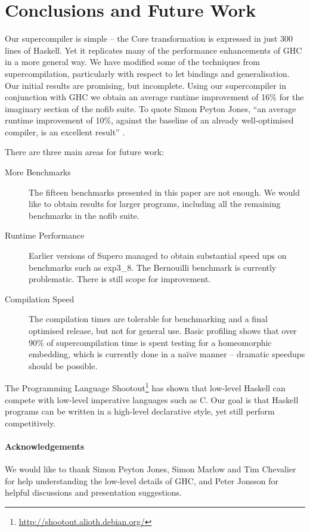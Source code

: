 \section{Conclusions and Future Work}
\label{sec:conclusion}

Our supercompiler is simple -- the Core transformation is expressed in just 300 lines of Haskell. Yet it replicates many of the performance enhancements of GHC in a more general way. We have modified some of the techniques from supercompilation, particularly with respect to let bindings and generalisation. Our initial results are promising, but incomplete. Using our supercompiler in conjunction with GHC we obtain an average runtime improvement of 16\% for the imaginary section of the nofib suite. To quote Simon Peyton Jones, ``an average runtime improvement of 10\%, against the baseline of an already well-optimised compiler, is an excellent result'' \cite{spj:specconstr}.

There are three main areas for future work:

\begin{description}
\item[More Benchmarks] The fifteen benchmarks presented in this paper are not enough. We would like to obtain results for larger programs, including all the remaining benchmarks in the nofib suite.
\item[Runtime Performance] Earlier versions of Supero \cite{me:supero_ifl} managed to obtain substantial speed ups on benchmarks such as exp3\_8. The Bernouilli benchmark is currently problematic. There is still scope for improvement.
\item[Compilation Speed] The compilation times are tolerable for benchmarking and a final optimised release, but not for general use. Basic profiling shows that over 90\% of supercompilation time is spent testing for a homeomorphic embedding, which is currently done in a na\"{i}ve manner -- dramatic speedups should be possible.
\end{description}

The Programming Language Shootout\footnote{\url{http://shootout.alioth.debian.org/}} has shown that low-level Haskell can compete with low-level imperative languages such as C. Our goal is that Haskell programs can be written in a high-level declarative style, yet still perform competitively.

\paragraph{Acknowledgements} We would like to thank Simon Peyton Jones, Simon Marlow and Tim Chevalier for help understanding the low-level details of GHC, and Peter Jonsson for helpful discussions and presentation suggestions.

